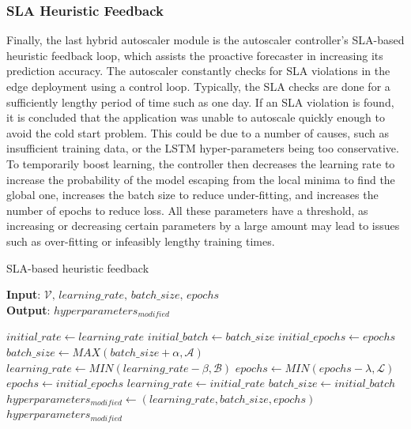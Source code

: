 \subsubsection{SLA Heuristic Feedback}

Finally, the last hybrid autoscaler module is the autoscaler controller's SLA-based heuristic feedback loop, which assists the proactive forecaster in increasing its prediction accuracy. The autoscaler constantly checks for SLA violations in the edge deployment using a control loop. Typically, the SLA checks are done for a sufficiently lengthy period of time such as one day. If an SLA violation is found, it is concluded that the application was unable to autoscale quickly enough to avoid the cold start problem. This could be due to a number of causes, such as insufficient training data, or the LSTM hyper-parameters being too conservative. To temporarily boost learning, the controller then decreases the learning rate to increase the probability of the model escaping from the local minima to find the global one, increases the batch size to reduce under-fitting, and increases the number of epochs to reduce loss. All these parameters have a threshold, as increasing or decreasing certain parameters by a large amount may lead to issues such as over-fitting or infeasibly lengthy training times.\par

\begin{algorithm}
    \caption{SLA-based heuristic feedback}
    \label{alg:sla-heuristic-feedback}
    \textbf{Input}: $\mathcal{V},\,learning\_rate,\,batch\_size,\,epochs$\\
    \textbf{Output}: $hyperparameters_{modified}$
    \begin{algorithmic}
        \State $initial\_rate \gets learning\_rate$
        \State $initial\_batch \gets batch\_size$
        \State $initial\_epochs \gets epochs$
            \State $batch\_size \gets MAX(batch\_size + \alpha, \mathcal{A})$
            \State $learning\_rate \gets MIN(learning\_rate - \beta, \mathcal{B})$
            \State $epochs \gets MIN(epochs - \lambda, \mathcal{L})$
        \Else
            \State $epochs \gets initial\_epochs$
            \State $learning\_rate \gets initial\_rate$
            \State $batch\_size \gets initial\_batch$
        \EndIf
        \State $hyperparameters_{modified} \gets (learning\_rate, batch\_size, epochs)$
        \State \Return $hyperparameters_{modified}$
    \end{algorithmic}
\end{algorithm}

